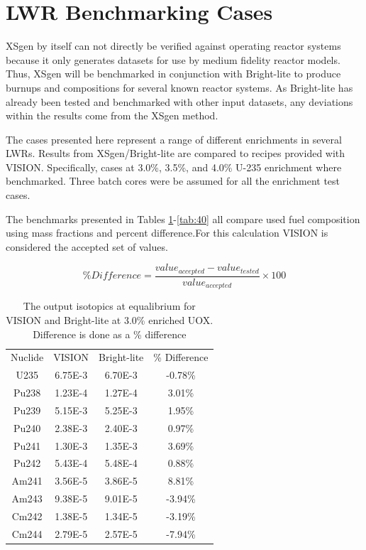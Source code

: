 \documentclass{article}
\begin{document}
\section{LWR Benchmarking Cases}

XSgen by itself can not directly be verified against operating reactor systems because it
only generates datasets for use by medium fidelity reactor models.
Thus, XSgen will be benchmarked in conjunction with Bright-lite to produce burnups and
compositions for several known reactor systems. As Bright-lite has already been tested
and benchmarked with other input datasets\cite{brightlite},
any deviations within the results come from the XSgen method.

The cases presented here represent a range of different enrichments in several LWRs.
Results from XSgen/Bright-lite are compared to recipes provided with VISION\cite{vision}.
Specifically, cases at 3.0\%, 3.5\%, and 4.0\% U-235 enrichment where benchmarked.
Three batch cores were be assumed for all the enrichment test cases.

The benchmarks presented in Tables \ref{tab:30}-\ref{tab:40}
all compare used fuel composition using mass fractions and percent difference.For this 
calculation VISION is considered the accepted set of values. 
 
\begin{equation}
\label{percentdiff}
\% Difference = \frac{value_{accepted} - value_{tested}}{value_{accepted}}\times100
\end{equation}

\begin{table}[!htb]
\centering
\small
\caption{The output isotopics at equalibrium for VISION and Bright-lite at 3.0\% enriched UOX. Difference is done as a \% difference}
\label{tab:30}
\vspace{0.5em}
\begin{tabular}{cccc}
Nuclide &  VISION & Bright-lite & \% Difference \\
U235  & 6.75E-3 & 6.70E-3 & -0.78\%\\
Pu238 & 1.23E-4 & 1.27E-4 & 3.01\%\\
Pu239 & 5.15E-3 & 5.25E-3 & 1.95\%\\
Pu240 & 2.38E-3 & 2.40E-3 & 0.97\%\\
Pu241 & 1.30E-3 & 1.35E-3 & 3.69\%\\
Pu242 & 5.43E-4 & 5.48E-4 & 0.88\%\\
Am241 & 3.56E-5 & 3.86E-5 & 8.81\%\\
Am243 & 9.38E-5 & 9.01E-5 & -3.94\%\\
Cm242 & 1.38E-5 & 1.34E-5 & -3.19\%\\
Cm244 & 2.79E-5 & 2.57E-5 & -7.94\%\\
\end{tabular}
\end{table}
\end{document}
